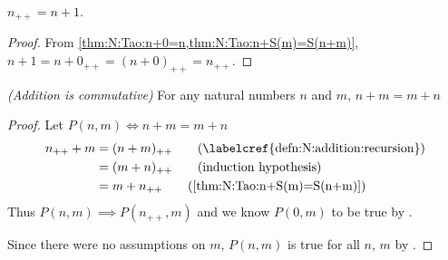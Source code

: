 \begin{cor} \label{thm:N:Tao:S(n)=n+1}
    $n_{++} = n + 1$.
\end{cor}

\begin{proof}
    From \cref{thm:N:Tao:n+0=n,thm:N:Tao:n+S(m)=S(n+m)}, $n + 1 = n + 0_{++} = (n + 0)_{++} = n_{++}$.
\end{proof}

\begin{prop} \label{thm:N:Tao:addition_is_commutative}
\emph{(Addition is commutative)} For any natural numbers $n$ and $m$, $n + m = m + n$
\end{prop}

\begin{proof}
    Let $P(n, m) \iff n + m = m + n$
    \begin{align*}
        n_{++} + m &= (n + m)_{++} \tag{\labelcref{defn:N:addition:recursion}} \\
                   &= (m + n)_{++} \tag{induction hypothesis} \\
                   &= m + n_{++}   \tag{\cref{thm:N:Tao:n+S(m)=S(n+m)}}
    \end{align*}
    Thus $P(n, m) \implies P(n_{++}, m)$ and we know $P(0, m)$ to be true by .

    Since there were no assumptions on $m$, $P(n, m)$ is true for all $n$, $m$ by .
\end{proof}

